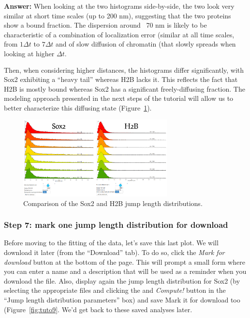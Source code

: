 \textbf{Answer:} When looking at the two histograms side-by-side, the two look very similar at short time scales (up to 200 nm), suggesting that the two proteins show a bound fraction. The dispersion around ~70 nm is likely to be characteristic of a combination of localization error (similar at all time scales, from \(1\Delta t\) to  \(7\Delta t\) and of slow diffusion of chromatin (that slowly spreads when looking at higher \(\Delta t\).

Then, when considering higher distances, the histograms differ significantly, with Sox2 exhibiting a ``heavy tail'' whereas H2B lacks it. This reflects the fact that H2B is mostly bound whereas Sox2 has a significant freely-diffusing fraction. The modeling approach presented in the next steps of the tutorial will allow us to better characterize this diffusing state (Figure~\ref{fig:tuto8}).

\begin{figure}[h!]
\centering
\includegraphics[width=0.7\textwidth]{../SPTGUI/static/SPTGUI/img/tutorial/0.7/tuto8.png}
\caption{\label{fig:tuto8}Comparison of the Sox2 and H2B jump length distributions.}
\end{figure}

\subsubsection{Step 7: mark one jump length distribution for download}

Before moving to the fitting of the data, let's save this last plot. We will download it later (from the ``Download'' tab). To do so, click the \textit{Mark for download} button at the bottom of the page. This will prompt a small form where you can enter a name and a description that will be used as a reminder when you download the file. Also, display again the jump length distribution for Sox2 (by selecting the appropriate files and clicking the and \textit{Compute!} button in the ``Jump length distribution parameters'' box) and save Mark it for download too (Figure~\ref{fig:tuto9}. We'd get back to these saved analyses later.

